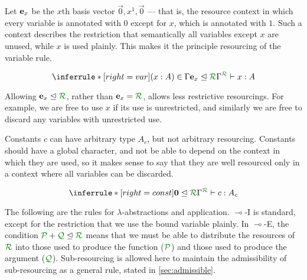 Let $\mathbf{e}_{x}$ be the $x$th basis vector $\vec 0, x^1, \vec 0$ --- that is, the
resource context in which every variable is annotated with $0$ except for $x$,
which is annotated with $1$.
Such a context describes the restriction that semantically all variables except
$x$ are unused, while $x$ is used plainly.
This makes it the principle resourcing of the variable rule.

\[
  \inferrule*[right=var]
  {(x : A) \in \Gamma
    \\ \subrctx{\basis x}{\resctx R}
  }
  {\ctx{\Gamma}{R} \vdash x : A}
\]

Allowing $\basis x \subres \resctx R$, rather than $\basis x = \resctx R$,
allows less restrictive resourcings.
For example, we are free to use $x$ if its use is unrestricted, and similarly we
are free to discard any variables with unrestricted use. 

Constants $c$ can have arbitrary type $A_c$, but not arbitrary resourcing.
Constants should have a global character, and not be able to depend on the
context in which they are used, so it makes sense to say that they are well
resourced only in a context where all variables can be discarded. 

\[
  \inferrule*[right=const]
  {\subrctx{\vct 0}{\resctx R}}
  {\ctx{\Gamma}{R} \vdash c : A_c}
\]

The following are the rules for $\lambda$-abstractions and application.
$\multimap$-I is standard, except for the restriction that we use the bound
variable plainly.
In $\multimap$-E, the condition $\resctx P + \resctx Q \subres \resctx R$
means that we must be able to distribute the resources of $\resctx R$ into
those used to produce the function ($\resctx P$) and those used to produce the
argument ($\resctx Q$).
Sub-resourcing is allowed here to maintain the admissibility of sub-resourcing
as a general rule, stated in \autoref{sec:admissible}. 


